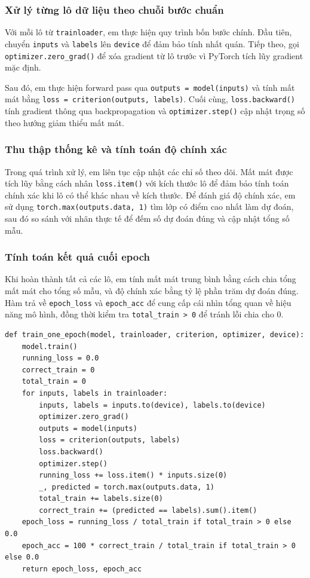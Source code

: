 \documentclass[12pt, a4paper, openany]{report}
\begin{document}
\subsubsection*{Xử lý từng lô dữ liệu theo chuỗi bước chuẩn}
Với mỗi lô từ \texttt{trainloader}, em thực hiện quy trình bốn bước chính. Đầu tiên, chuyển \texttt{inputs} và \texttt{labels} lên \texttt{device} để đảm bảo tính nhất quán. Tiếp theo, gọi \texttt{optimizer.zero\_grad()} để xóa gradient từ lô trước vì PyTorch tích lũy gradient mặc định.

Sau đó, em thực hiện forward pass qua \texttt{outputs = model(inputs)} và tính mất mát bằng \texttt{loss = criterion(outputs, labels)}. Cuối cùng, \texttt{loss.backward()} tính gradient thông qua backpropagation và \texttt{optimizer.step()} cập nhật trọng số theo hướng giảm thiểu mất mát.

\subsubsection*{Thu thập thống kê và tính toán độ chính xác}
Trong quá trình xử lý, em liên tục cập nhật các chỉ số theo dõi. Mất mát được tích lũy bằng cách nhân \texttt{loss.item()} với kích thước lô để đảm bảo tính toán chính xác khi lô có thể khác nhau về kích thước.
Để đánh giá độ chính xác, em sử dụng \texttt{torch.max(outputs.data, 1)} tìm lớp có điểm cao nhất làm dự đoán, sau đó so sánh với nhãn thực tế để đếm số dự đoán đúng và cập nhật tổng số mẫu.

\subsubsection*{Tính toán kết quả cuối epoch}
Khi hoàn thành tất cả các lô, em tính mất mát trung bình bằng cách chia tổng mất mát cho tổng số mẫu, và độ chính xác bằng tỷ lệ phần trăm dự đoán đúng. Hàm trả về \texttt{epoch\_loss} và \texttt{epoch\_acc} để cung cấp cái nhìn tổng quan về hiệu năng mô hình, đồng thời kiểm tra \texttt{total\_train > 0} để tránh lỗi chia cho 0.

\begin{verbatim}
def train_one_epoch(model, trainloader, criterion, optimizer, device):
    model.train()
    running_loss = 0.0
    correct_train = 0
    total_train = 0
    for inputs, labels in trainloader:
        inputs, labels = inputs.to(device), labels.to(device)
        optimizer.zero_grad()
        outputs = model(inputs)
        loss = criterion(outputs, labels)
        loss.backward()
        optimizer.step()
        running_loss += loss.item() * inputs.size(0)
        _, predicted = torch.max(outputs.data, 1)
        total_train += labels.size(0)
        correct_train += (predicted == labels).sum().item()
    epoch_loss = running_loss / total_train if total_train > 0 else 0.0
    epoch_acc = 100 * correct_train / total_train if total_train > 0 else 0.0
    return epoch_loss, epoch_acc
\end{verbatim}
\end{document}
